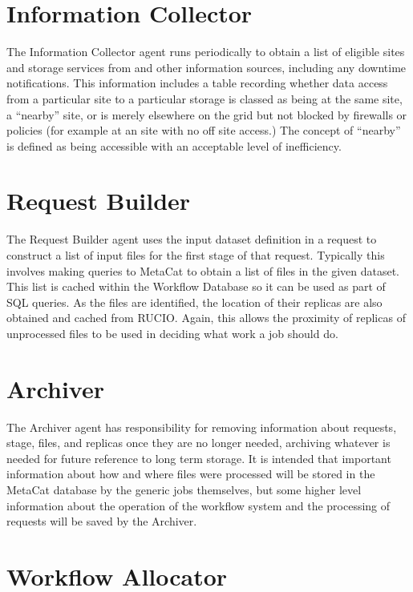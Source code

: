 \documentclass[../main-v1.tex]{subfiles}
\begin{document}
\section{Information Collector}
\label{sec:flow:collector}

The Information Collector agent runs periodically to obtain a list of eligible sites and storage services from  and other information sources, including any downtime notifications. This information includes a table recording whether data access from a particular site to a particular storage is classed as being at the same site, a ``nearby'' site, or is merely elsewhere on the grid but not blocked by firewalls or policies (for example at an  site with no off site access.) The concept of ``nearby'' is defined as being accessible with an acceptable level of inefficiency.

\section{Request Builder}
\label{sec:flow:builder}

The Request Builder agent uses the input dataset definition in a request to construct a list of input files for the first stage of that request. Typically this involves making queries to MetaCat to obtain a list of files in the given dataset. This list is cached within the Workflow Database so it can be used as part of SQL queries. As the files are identified, the location of their replicas are also obtained and cached from RUCIO. Again, this allows the proximity of replicas of unprocessed files to be used in deciding what work a job should do.

\section{Archiver}
\label{sec:flow:archiver}

The Archiver agent has responsibility for removing information about requests, stage, files, and replicas once they are no longer needed, archiving whatever is needed for future reference to long term storage. It is intended that important information about how and where files were processed will be stored in the MetaCat database by the generic jobs themselves, but some higher level information about the operation of the workflow system and the processing of requests will be saved by the Archiver.

\section{Workflow Allocator}
\label{sec:flow:allocator}
\end{document}
